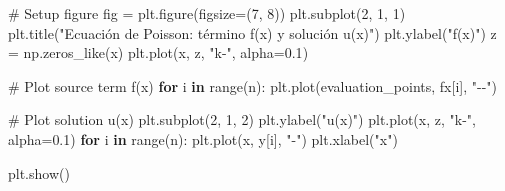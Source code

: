 \documentclass[
  spanish,
  us-letterpaper,
]{scrreprt}
\newenvironment{Shaded}{\begin{snugshade}}{\end{snugshade}}
\newcommand{\BuiltInTok}[1]{\textcolor[rgb]{0.00,0.23,0.31}{#1}}
\newcommand{\CommentTok}[1]{\textcolor[rgb]{0.37,0.37,0.37}{#1}}
\newcommand{\ControlFlowTok}[1]{\textcolor[rgb]{0.00,0.23,0.31}{\textbf{#1}}}
\newcommand{\DecValTok}[1]{\textcolor[rgb]{0.68,0.00,0.00}{#1}}
\newcommand{\FloatTok}[1]{\textcolor[rgb]{0.68,0.00,0.00}{#1}}
\newcommand{\KeywordTok}[1]{\textcolor[rgb]{0.00,0.23,0.31}{\textbf{#1}}}
\newcommand{\NormalTok}[1]{\textcolor[rgb]{0.00,0.23,0.31}{#1}}
\newcommand{\OperatorTok}[1]{\textcolor[rgb]{0.37,0.37,0.37}{#1}}
\newcommand{\StringTok}[1]{\textcolor[rgb]{0.13,0.47,0.30}{#1}}
\theoremstyle{plain}
\theoremstyle{definition}
\theoremstyle{remark}
\begin{document}
\begin{Shaded}
\begin{Highlighting}[]
\CommentTok{\# Setup figure}
\NormalTok{fig }\OperatorTok{=}\NormalTok{ plt.figure(figsize}\OperatorTok{=}\NormalTok{(}\DecValTok{7}\NormalTok{, }\DecValTok{8}\NormalTok{))}
\NormalTok{plt.subplot(}\DecValTok{2}\NormalTok{, }\DecValTok{1}\NormalTok{, }\DecValTok{1}\NormalTok{)}
\NormalTok{plt.title(}\StringTok{"Ecuación de Poisson: término f(x) y solución u(x)"}\NormalTok{)}
\NormalTok{plt.ylabel(}\StringTok{"f(x)"}\NormalTok{)}
\NormalTok{z }\OperatorTok{=}\NormalTok{ np.zeros\_like(x)}
\NormalTok{plt.plot(x, z, }\StringTok{"k{-}"}\NormalTok{, alpha}\OperatorTok{=}\FloatTok{0.1}\NormalTok{)}

\CommentTok{\# Plot source term f(x)}
\ControlFlowTok{for}\NormalTok{ i }\KeywordTok{in} \BuiltInTok{range}\NormalTok{(n):}
\NormalTok{    plt.plot(evaluation\_points, fx[i], }\StringTok{"{-}{-}"}\NormalTok{)}

\CommentTok{\# Plot solution u(x)}
\NormalTok{plt.subplot(}\DecValTok{2}\NormalTok{, }\DecValTok{1}\NormalTok{, }\DecValTok{2}\NormalTok{)}
\NormalTok{plt.ylabel(}\StringTok{"u(x)"}\NormalTok{)}
\NormalTok{plt.plot(x, z, }\StringTok{"k{-}"}\NormalTok{, alpha}\OperatorTok{=}\FloatTok{0.1}\NormalTok{)}
\ControlFlowTok{for}\NormalTok{ i }\KeywordTok{in} \BuiltInTok{range}\NormalTok{(n):}
\NormalTok{    plt.plot(x, y[i], }\StringTok{"{-}"}\NormalTok{)}
\NormalTok{plt.xlabel(}\StringTok{"x"}\NormalTok{)}

\NormalTok{plt.show()}
\end{Highlighting}
\end{Shaded}
\end{document}
